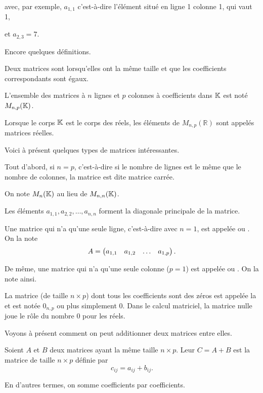 \change
avec, par exemple, $a_{1,1}$ c'est-à-dire l'élément situé en ligne 1 colonne 1, qui vaut 1,

\change
 et $a_{2,3}=7$. 
 
\change
Encore quelques définitions.

Deux matrices sont  lorsqu'elles ont la même taille et que les coefficients correspondants sont égaux. 
  
\change
L'ensemble des matrices à $n$ lignes et $p$ colonnes à coefficients dans $\mathbb{K}$ est noté $M_{n,p}(\mathbb{K})$. 

Lorsque le corps $\mathbb{K}$ est le corps des réels, les éléments de $M_{n,p}(\mathbb{R})$ sont appelés matrices réelles.

\diapo

Voici à présent quelques types de matrices intéressantes.

Tout d'abord, si $n=p$, c'est-à-dire si le nombre de lignes est le même que le nombre de colonnes, la matrice est dite matrice carrée.

On note $M_{n}(\mathbb{K})$ au lieu de $M_{n,n}(\mathbb{K})$.

\change
 Les éléments $a_{1,1}, a_{2,2}, \ldots, a_{n,n}$ forment la diagonale principale de la matrice.

\change
Une matrice qui n'a qu'une seule ligne, c'est-à-dire avec $n=1$, est appelée  ou . On la note 
$$A=\begin{pmatrix} 
a_{1,1}& a_{1,2}&  \ldots & a_{1,p}\cr
\end{pmatrix}.$$

\change
De même, une matrice qui n'a qu'une seule colonne ($p=1$) est appelée  ou . On la note ainsi.

\change
La matrice (de taille $n\times p$) dont tous les coefficients sont des zéros 
est appelée la  et est notée $0_{n,p}$ ou plus simplement $0$. 
Dans le calcul matriciel, la matrice nulle joue le rôle du nombre $0$ pour les réels.

\diapo
Voyons à présent comment on peut additionner deux matrices entre elles.

Soient $A$ et $B$ deux matrices ayant la même taille $n\times p$. Leur  $C=A+B$ est la matrice de taille $n\times p$ définie par 
\[c_{ij}=a_{ij}+b_{ij}.\]

En d'autres termes, on somme coefficients par coefficients.

